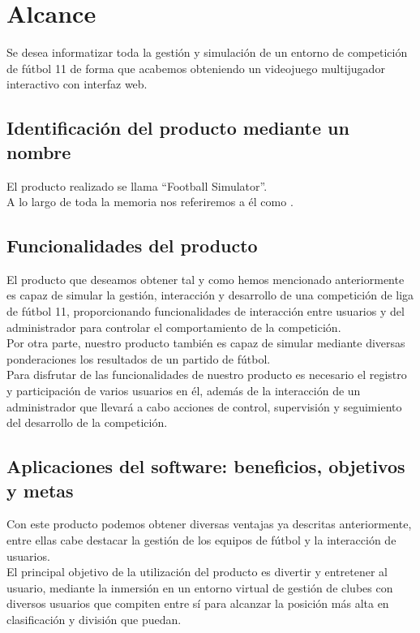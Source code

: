 \section{Alcance}
Se desea informatizar toda la gestión y simulación de un entorno de
competición de fútbol 11 de forma que acabemos obteniendo un
videojuego multijugador interactivo con interfaz web.

\subsection{Identificación del producto mediante un nombre}
El producto realizado se llama ``Football Simulator''.\\

A lo largo de toda la memoria nos referiremos a él como
.

\subsection{Funcionalidades del producto}
El producto que deseamos obtener tal y como hemos mencionado
anteriormente es capaz de simular la gestión, interacción y desarrollo
de una competición de liga de fútbol 11, proporcionando
funcionalidades de interacción entre usuarios y del administrador para
controlar el comportamiento de la competición.\\

Por otra parte, nuestro producto también es capaz de simular mediante
diversas ponderaciones los resultados de un partido de fútbol.\\

Para disfrutar de las funcionalidades de nuestro producto es necesario
el registro y participación de varios usuarios en él, además de la
interacción de un administrador que llevará a cabo acciones de
control, supervisión y seguimiento del desarrollo de la competición.

\subsection{Aplicaciones del software: beneficios, objetivos y metas}

Con este producto podemos obtener diversas ventajas ya descritas
anteriormente, entre ellas cabe destacar la gestión de los equipos de
fútbol y la interacción de usuarios.\\

El principal objetivo de la utilización del producto es divertir y
entretener al usuario, mediante la inmersión en un entorno virtual de
gestión de clubes con diversos usuarios que compiten entre sí para
alcanzar la posición más alta en clasificación y división que puedan.\\

